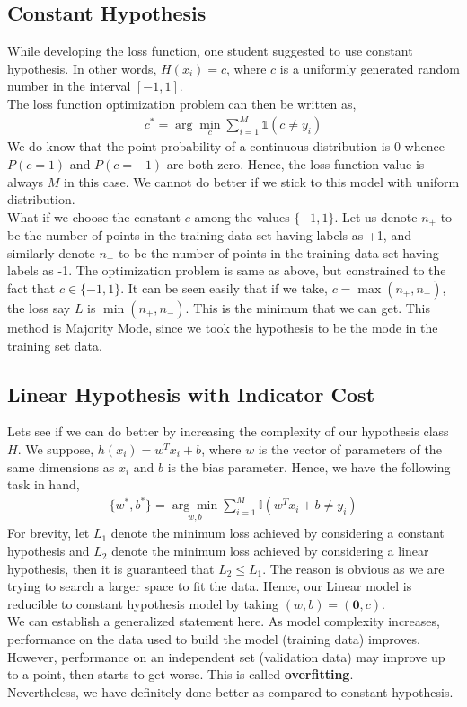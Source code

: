 \documentclass[12pt]{article}
\begin{document}
\subsection{Constant Hypothesis}
While developing the loss function, one student suggested to use constant hypothesis. In other words, $H(x_i) = c$, where $c$ is a uniformly generated random number in the interval $[-1,1]$.\\
The loss function optimization problem can then be written as,
\begin{align*}
    c^{*} = \arg\min_{c} \sum_{i=1}^{M}\mathds{1}(c \ne y_i)
\end{align*}
We do know that the point probability of a continuous distribution is $0$ whence $P(c=1)$ and $P(c=-1)$ are both zero. Hence, the loss function value is always $M$ in this case. We cannot do better if we stick to this model with uniform distribution. \\
What if we choose the constant $c$ among the values $\{-1,1\}$. Let us denote $n_+$ to be the number of points in the training data set having labels as +1, and similarly denote $n_-$ to be the number of points in the training data set having labels as -1. The optimization problem is same as above, but constrained to the fact that $c \in \{-1,1\}$. It can be seen easily that if we take, $c = \max(n_+, n_-)$, the loss say $L$ is $\min(n_+, n_-)$. This is the minimum that we can get. This method is Majority Mode, since we took the hypothesis to be the mode in the training set data.
\subsection{Linear Hypothesis with Indicator Cost}
Lets see if we can do better by increasing the complexity of our hypothesis class $H$. We suppose, $h(x_i) = w^Tx_i+b$, where $w$ is the vector of parameters of the same dimensions as $x_i$ and $b$ is the bias parameter. Hence, we have the following task in hand,
\begin{align*}
    \{w^{*}, b^{*}\} = \underset{w, b}{\arg\min} \sum_{i=1}^{M} \mathbb{I}(w^Tx_i+b \ne y_i)
\end{align*}
For brevity, let $L_1$ denote the minimum loss achieved by considering a constant hypothesis and $L_2$ denote the minimum loss achieved by considering a linear hypothesis, then it is guaranteed that $L_2 \leq L_1$. The reason is obvious as we are trying to search a larger space to fit the data. Hence, our Linear model is reducible to constant hypothesis model by taking $(w, b) = (\mathbf{0}, c)$. \\
We can establish a generalized statement here. As model complexity increases, performance on the data used to build the model (training data) improves. However, performance on an independent set (validation data) may improve up to a point, then starts to get worse. This is called \textbf{overfitting}.\\
Nevertheless, we have definitely done better as compared to  constant hypothesis.
\end{document}
